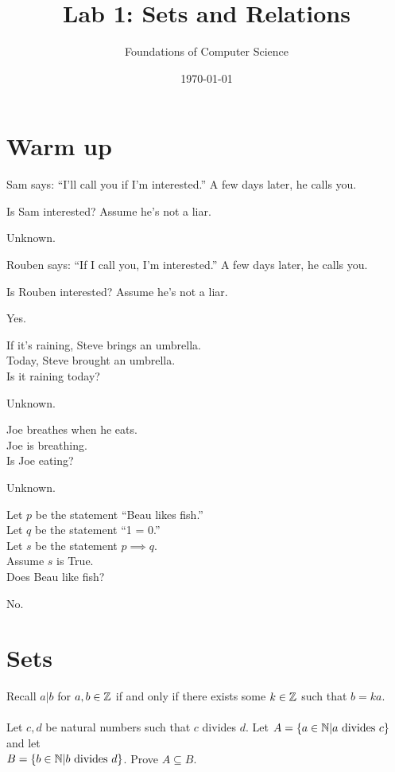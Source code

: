 \documentclass[]{exam}
\title{Lab 1: Sets and Relations}
\author{Foundations of Computer Science}
\date{\today}
\begin{document}
\maketitle

\begin{questions}

\section*{Warm up}
\question
Sam says: ``I'll call you if I'm interested.'' A few days later, he calls you.

Is Sam interested? Assume he's not a liar.

\begin{solution}
Unknown.
\end{solution}

\question
Rouben says: ``If I call you, I'm interested.'' A few days later, he calls you.

Is Rouben interested? Assume he's not a liar.

\begin{solution}
Yes.
\end{solution}


\question If it's raining, Steve brings an umbrella.\\
    Today, Steve brought an umbrella.\\
    Is it raining today?

\begin{solution}
Unknown.
\end{solution}


\question Joe breathes when he eats.\\
    Joe is breathing.\\
    Is Joe eating?
\begin{solution}
Unknown.
\end{solution}


\question Let $p$ be the statement ``Beau likes fish.''\\
    Let $q$ be the statement ``1 = 0.''\\
    Let $s$ be the statement $p \implies q$.\\
    Assume $s$ is True.\\
    Does Beau like fish?
\begin{solution}
No.
\end{solution}

\newpage
\section*{Sets}
\question
Recall $a|b$ for $a,b \in \mathbb{Z}$ if and only if there exists some $k \in \mathbb{Z}$ such that $b = ka$.
\\~\\
Let $c, d$ be natural numbers such that $c$ divides $d$.
   Let $A = \{a \in \mathbb{N}| a \text{ divides } c \}$ and let\\ 
   $B = \{b \in \mathbb{N}| b\text{ divides }d \}$. Prove $A \subseteq B$.


\end{questions}
\end{document}
